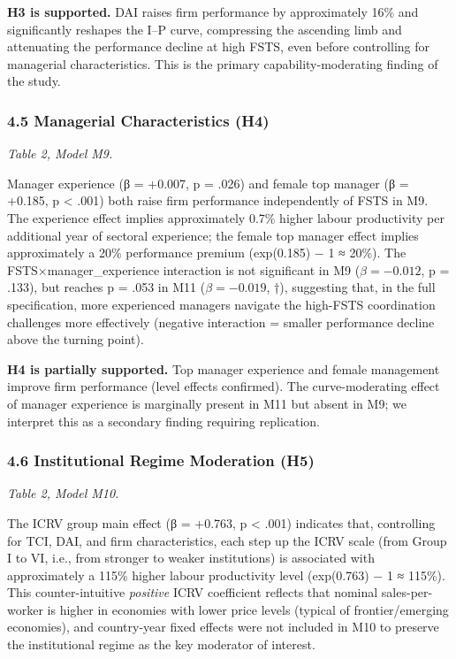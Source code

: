 \documentclass[12pt,a4paper]{article}
\begin{document}
\textbf{H3 is supported.} DAI raises firm performance by approximately
16\% and significantly reshapes the I--P curve, compressing the
ascending limb and attenuating the performance decline at high FSTS,
even before controlling for managerial characteristics. This is the
primary capability-moderating finding of the study.

\hypertarget{45-managerial-characteristics-h4}{%
\subsubsection{4.5 Managerial Characteristics
(H4)}\label{45-managerial-characteristics-h4}}

\emph{Table 2, Model M9.}

Manager experience (β = +0.007, p = .026) and female top manager (β =
+0.185, p \textless{} .001) both raise firm performance independently of
FSTS in M9. The experience effect implies approximately 0.7\% higher
labour productivity per additional year of sectoral experience; the
female top manager effect implies approximately a 20\% performance
premium (exp(0.185) − 1 ≈ 20\%). The FSTS×manager\_experience
interaction is not significant in M9 (\(\beta = −0.012\), p = .133), but
reaches p = .053 in M11 (\(\beta = −0.019\), †), suggesting that, in the
full specification, more experienced managers navigate the high-FSTS
coordination challenges more effectively (negative interaction = smaller
performance decline above the turning point).

\textbf{H4 is partially supported.} Top manager experience and female
management improve firm performance (level effects confirmed). The
curve-moderating effect of manager experience is marginally present in
M11 but absent in M9; we interpret this as a secondary finding requiring
replication.

\hypertarget{46-institutional-regime-moderation-h5}{%
\subsubsection{4.6 Institutional Regime Moderation
(H5)}\label{46-institutional-regime-moderation-h5}}

\emph{Table 2, Model M10.}

The ICRV group main effect (β = +0.763, p \textless{} .001) indicates
that, controlling for TCI, DAI, and firm characteristics, each step up
the ICRV scale (from Group I to VI, i.e., from stronger to weaker
institutions) is associated with approximately a 115\% higher labour
productivity level (exp(0.763) − 1 ≈ 115\%). This counter-intuitive
\emph{positive} ICRV coefficient reflects that nominal sales-per-worker
is higher in economies with lower price levels (typical of
frontier/emerging economies), and country-year fixed effects were not
included in M10 to preserve the institutional regime as the key
moderator of interest.
\end{document}
